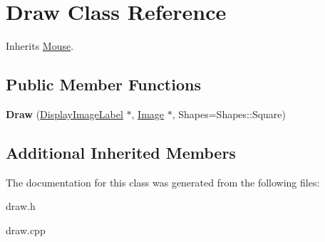 \hypertarget{class_draw}{}\section{Draw Class Reference}
\label{class_draw}


Inherits \mbox{\hyperlink{class_mouse}{Mouse}}.

\subsection*{Public Member Functions}
\begin{DoxyCompactItemize}
\item 
\mbox{\label{class_draw_a73551de1fb9e3f3b272af9e829647e5d}} 
{\bfseries Draw} (\mbox{\hyperlink{class_display_image_label}{Display\+Image\+Label}} $\ast$, \mbox{\hyperlink{class_image}{Image}} $\ast$, Shapes=Shapes\+::\+Square)
\end{DoxyCompactItemize}
\subsection*{Additional Inherited Members}


The documentation for this class was generated from the following files\+:\begin{DoxyCompactItemize}
\item 
draw.\+h\item 
draw.\+cpp\end{DoxyCompactItemize}
